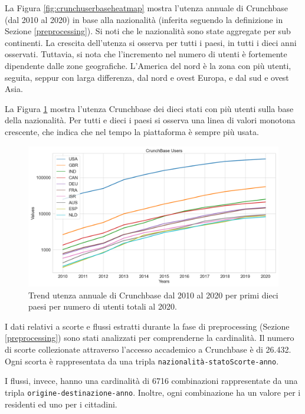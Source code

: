 La Figura \ref{fig:crunchuserbaseheatmap} mostra l'utenza annuale di Crunchbase (dal 2010 al 2020) in base alla nazionalità (inferita seguendo la definizione in Sezione \ref{preprocessing}). Si noti che le nazionalità sono state aggregate per sub continenti.
La crescita dell'utenza si osserva per tutti i paesi, in tutti i dieci anni osservati. Tuttavia, si nota che l'incremento nel numero di utenti è fortemente dipendente  dalle zone geografiche. L'America del nord è la zona con più utenti, seguita, seppur con larga differenza, dal nord e ovest Europa, e dal sud e ovest Asia. 

La Figura \ref{fig:lineplotutenza} mostra l'utenza Crunchbase dei dieci stati con più utenti sulla base della nazionalità. 
Per tutti e dieci i paesi si osserva una linea di valori monotona crescente, che indica che nel tempo la piattaforma è sempre più usata. 
\begin{figure}[tb]
\hfill
    \centering
    \includegraphics[width=1.0\textwidth]{images/crunchbase_userbase/lineplotlog.png}
    \caption{Trend utenza annuale di Crunchbase dal 2010 al 2020 per primi dieci paesi per numero di utenti totali al 2020.}
    \label{fig:lineplotutenza}
\end{figure}


I dati relativi a scorte e flussi estratti durante la fase di preprocessing (Sezione \ref{preprocessing}) sono stati analizzati per comprenderne la cardinalità. Il numero di scorte collezionate attraverso l'accesso accademico a Crunchbase è di 26.432. Ogni scorta è rappresentata da una tripla \texttt{nazionalità-statoScorte-anno}. 


I flussi, invece, hanno una cardinalità di 6716 combinazioni rappresentate da una tripla \texttt{origine-destinazione-anno}. Inoltre, ogni combinazione ha un valore per i residenti ed uno per i cittadini. 

